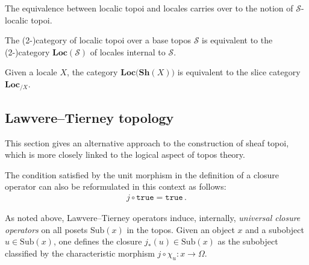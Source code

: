     The equivalence between localic topoi and locales carries over to the notion of $\mathcal{S}$-localic topoi.
    \begin{property}
        The (2-)category of localic topoi over a base topos $\mathcal{S}$ is equivalent to the (2-)category $\mathbf{Loc}(\mathcal{S})$ of locales internal to $\mathcal{S}$.
    \end{property}
    \begin{property}\label{topos:slice_locale}
        Given a locale $X$, the category $\mathbf{Loc}\bigl(\mathbf{Sh}(X)\bigr)$ is equivalent to the slice category $\mathbf{Loc}_{/X}$.
    \end{property}

\subsection{Lawvere--Tierney topology}

    This section gives an alternative approach to the construction of sheaf topoi, which is more closely linked to the logical aspect of topos theory.

    \begin{remark}
        The condition satisfied by the unit morphism in the definition of a closure operator can also be reformulated in this context as follows:
        \begin{gather}
            j\circ\texttt{true} = \texttt{true}\,.
        \end{gather}
    \end{remark}
    
    As noted above, Lawvere--Tierney operators induce, internally, \textit{universal closure operators} on all posets $\mathrm{Sub}(x)$ in the topos. Given an object $x$ and a subobject $u\in\text{Sub}(x)$, one defines the closure $j_\ast(u)\in\text{Sub}(x)$ as the subobject classified by the characteristic morphism $j\circ\chi_u:x\rightarrow\Omega$.

